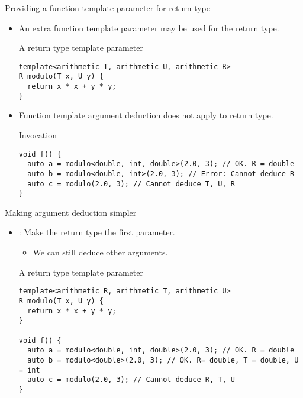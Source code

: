 \begin{frame}[t,fragile]{Providing a function template parameter for return type}

\begin{itemize}
  \item An extra function template parameter may be used for the return type.

\begin{block}{A return type template parameter}
\begin{lstlisting}
template<arithmetic T, arithmetic U, arithmetic R>
R modulo(T x, U y) {
  return x * x + y * y;
}
\end{lstlisting}
\end{block}

  \item Function template argument deduction does not apply to return type.

\begin{block}{Invocation}
\begin{lstlisting}
void f() {
  auto a = modulo<double, int, double>(2.0, 3); // OK. R = double
  auto b = modulo<double, int>(2.0, 3); // Error: Cannot deduce R
  auto c = modulo(2.0, 3); // Cannot deduce T, U, R
}
\end{lstlisting}
\end{block}

\end{itemize}
\end{frame}

\begin{frame}[t,fragile]{Making argument deduction simpler}
\begin{itemize}
  \item {}: Make the return type the first parameter.
    \begin{itemize}
      \item We can still deduce other arguments.
    \end{itemize}
\begin{block}{A return type template parameter}
\begin{lstlisting}
template<arithmetic R, arithmetic T, arithmetic U>
R modulo(T x, U y) {
  return x * x + y * y;
}

void f() {
  auto a = modulo<double, int, double>(2.0, 3); // OK. R = double
  auto b = modulo<double>(2.0, 3); // OK. R= double, T = double, U = int
  auto c = modulo(2.0, 3); // Cannot deduce R, T, U
}
\end{lstlisting}
\end{block}

\end{itemize}
\end{frame}
